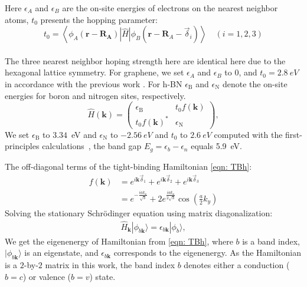 Here $\epsilon_{A}$ and $\epsilon_{B}$ are the on-site energies of electrons on the nearest neighbor atoms, $t_0$ presents the hopping parameter:
$$
	t_{0}=\left\langle\phi_{A}\left(\mathbf{r}-\mathbf{R}_{\mathbf{A}}\right)|\hat{H}| \phi_{B}\left(\mathbf{r}-\mathbf{R}_{A}-\vec{\delta}_{i}\right)\right\rangle \quad(i=1,2,3)
$$\\
The three nearest neighbor hoping strength here are identical here due to the hexagonal lattice symmetry. For graphene, we set $\epsilon_{A}$ and $\epsilon_{B}$ to 0, and $t_0=2.8~eV$ in accordance with the previous work  \cite{sarma2011electronic}. For h-BN $\epsilon_{\mathrm{B}}$ and $\epsilon_{\mathrm{N}}$ denote the on-site energies for boron and nitrogen sites, respectively.
\begin{equation}
	\hat{H}(\mathbf{k})=\left(\begin{array}{cc}
			\epsilon_{\mathrm{B}}   & t_{0} f(\mathbf{k})   \\
			t_{0} f(\mathbf{k})^{*} & \epsilon_{\mathrm{N}}
		\end{array}\right),
	\label{eqn:hBNhamiltonian}
\end{equation}
We set $\epsilon_{\mathrm{B}}$ to $3.34$~eV and $\epsilon_{\mathrm{N}}$ to $-2.56~eV$ and $t_0$ to $2.6~eV$ computed with the first-principles calculations~\cite{PhysRevB.51.6868}, the band gap $E_{g}=\epsilon_{b}-\epsilon_{n}$ equals 5.9~eV.

The off-diagonal terms of the tight-binding Hamiltonian \ref{eqn: TBh}:
\begin{equation}
	\begin{aligned}
		f(\mathbf{k}) & =e^{i \mathbf{k} \vec{\delta}_{1}}+e^{i \mathbf{k} \vec{\delta}_{2}}+e^{i \mathbf{k} \vec{\delta}_{3}}  \\
		              & =e^{-\frac{i a k_{x}}{\sqrt{3}}}+2 e^{\frac{i a k_{x}}{2 \sqrt{3}}} \cos \left(\frac{a}{2} k_{y}\right)
	\end{aligned}
	\label{eqn:nearest_h}
\end{equation}
Solving the stationary Schrödinger equation using matrix diagonalization:
\begin{align}
	\hat{H}_{\mathbf{k}}|\phi_{b \mathbf{k}}\rangle = \epsilon_{b\mathbf{k}}|\phi_{b}\rangle,
	\label{eq:eqigenstates-h0}
\end{align}
We get the eigenenergy of Hamiltonian from \ref{eqn: TBh}, where $b$ is a band index, $|\phi_{b\mathbf{k}}\rangle$ is an eigenstate, and $\epsilon_{b\mathbf{k}}$ corresponds to the eigenenergy. As the Hamiltonian is a $2$-by-$2$ matrix in this work, the band index $b$ denotes either a conduction ($b=c$) or valence ($b=v$) state.

